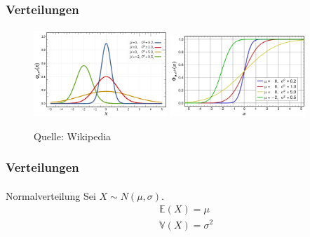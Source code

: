 \documentclass{beamer}
\begin{document}
\begin{frame}
    \frametitle{ Verteilungen}
\framesubtitle{}
\begin{figure}[htp]
      \centering
    \includegraphics[width=0.45\textwidth]{img/normal}
    \includegraphics[width=0.45\textwidth]{img/normaldist}
      \caption{Quelle: Wikipedia}
\end{figure}

 \end{frame}


\begin{frame}
    \frametitle{Verteilungen}
\framesubtitle{}

\begin{block}{Normalverteilung}
Sei $X \sim N(\mu, \sigma)$.
\begin{align*}
& \mathbb{E}(X) = \mu \\
& \mathbb{V}(X) = \sigma^2
\end{align*}
\end{block}
 \end{frame}
\end{document}
